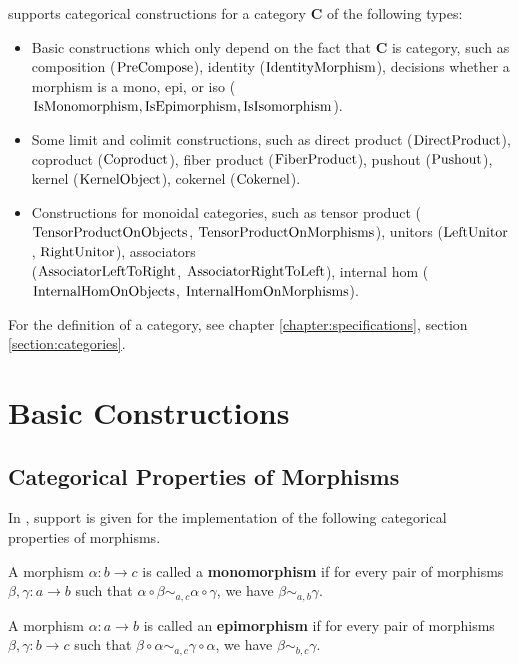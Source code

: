 \CapPkg supports categorical constructions 
for a category $\mathbf{C}$
of the following types:

\begin{itemize}
 \item Basic constructions which only depend on the fact that $\mathbf{C}$ is category,
 such as composition ($\mathrm{PreCompose}$), identity ($\mathrm{IdentityMorphism}$), decisions whether
 a morphism is a mono, epi, or iso ($\mathrm{IsMonomorphism}, \mathrm{IsEpimorphism}, \mathrm{IsIsomorphism}$).
 \item Some limit and colimit constructions, such as direct product ($\mathrm{DirectProduct}$),
 coproduct ($\mathrm{Coproduct}$), fiber product ($\mathrm{FiberProduct}$), pushout ($\mathrm{Pushout}$),
 kernel ($\mathrm{KernelObject}$), cokernel ($\mathrm{Cokernel}$).
 \item Constructions for monoidal categories, such as tensor product ($\mathrm{TensorProductOnObjects}$, $\mathrm{TensorProductOnMorphisms}$),
 unitors ($\mathrm{LeftUnitor}$, $\mathrm{RightUnitor}$), associators \\($\mathrm{AssociatorLeftToRight}$, $\mathrm{AssociatorRightToLeft}$),
 internal hom ($\mathrm{InternalHomOnObjects}$, $\mathrm{InternalHomOnMorphisms}$).
\end{itemize}

\begin{notation}
 For the definition of a category, see chapter \ref{chapter:specifications}, section \ref{section:categories}.
\end{notation}


\section{Basic Constructions}

\subsection{Categorical Properties of Morphisms}

In \CapPkg, support is given for the implementation of the following categorical properties
of morphisms.


\begin{definition}
A morphism $\alpha: b \rightarrow c$ is called a \textbf{monomorphism} if for every pair of morphisms 
$\beta, \gamma: a \rightarrow b$ such that $\alpha \circ \beta \sim_{a,c} \alpha \circ \gamma$,
we have $\beta \sim_{a,b} \gamma$.
\end{definition}


\begin{definition}
 A morphism $\alpha: a \rightarrow b$ is called an \textbf{epimorphism} if for every pair of morphisms
 $\beta, \gamma: b \rightarrow c$ such that $\beta \circ \alpha \sim_{a,c} \gamma \circ \alpha$,
 we have $\beta \sim_{b,c} \gamma$.
\end{definition}

